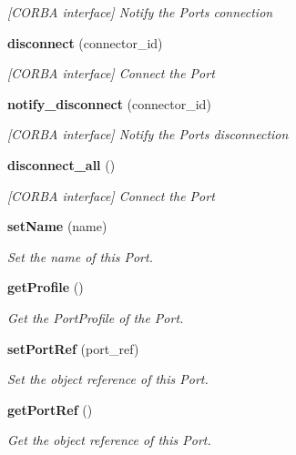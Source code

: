 \begin{CompactItemize}
\begin{CompactList}\small\item\em [CORBA interface] Notify the Ports connection \item\end{CompactList}\item 
{\bf disconnect} (connector\_\-id)
\begin{CompactList}\small\item\em [CORBA interface] Connect the Port \item\end{CompactList}\item 
{\bf notify\_\-disconnect} (connector\_\-id)
\begin{CompactList}\small\item\em [CORBA interface] Notify the Ports disconnection \item\end{CompactList}\item 
{\bf disconnect\_\-all} ()
\begin{CompactList}\small\item\em [CORBA interface] Connect the Port \item\end{CompactList}\item 
{\bf set\-Name} (name)
\begin{CompactList}\small\item\em Set the name of this Port. \item\end{CompactList}\item 
{\bf get\-Profile} ()
\begin{CompactList}\small\item\em Get the Port\-Profile of the Port. \item\end{CompactList}\item 
{\bf set\-Port\-Ref} (port\_\-ref)
\begin{CompactList}\small\item\em Set the object reference of this Port. \item\end{CompactList}\item 
{\bf get\-Port\-Ref} ()
\begin{CompactList}\small\item\em Get the object reference of this Port. \item\end{CompactList}\item 

\end{CompactItemize}
